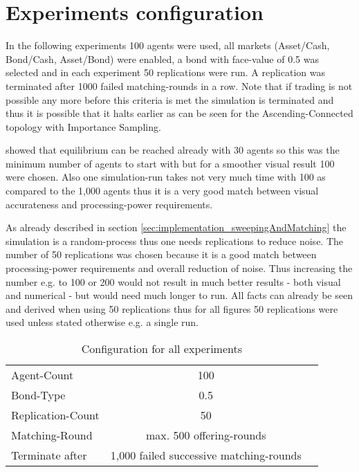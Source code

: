 \documentclass[Bachelorarbeit.tex]{subfiles}
\begin{document}
\section{Experiments configuration}
In the following experiments 100 agents were used, all markets (Asset/Cash, Bond/Cash, Asset/Bond) were enabled, a bond with face-value of 0.5 was selected and in each experiment 50 replications were run. A replication was terminated after 1000 failed matching-rounds in a row. Note that if trading is not possible any more before this criteria is met the simulation is terminated and thus it is possible that it halts earlier as can be seen for the Ascending-Connected topology with Importance Sampling.

\bigskip 

\cite{Breuer2015} showed that equilibrium can be reached already with 30 agents so this was the minimum number of agents to start with but for a smoother visual result 100 were chosen. Also one simulation-run takes not very much time with 100 as compared to the 1,000 agents thus it is a very good match between visual accurateness and processing-power requirements.

\medskip

As already described in section \ref{sec:implementation_sweepingAndMatching} the simulation is a random-process thus one needs replications to reduce noise. The number of 50 replications was chosen because it is a good match between processing-power requirements and overall reduction of noise. Thus increasing the number e.g. to 100 or 200 would not result in much better results - both visual and numerical - but would need much longer to run. All facts can already be seen and derived when using 50 replications thus for all figures 50 replications were used unless stated otherwise e.g. a single run.

\begin{table}[H]
	\centering
	\caption{Configuration for all experiments}
	\begin{tabular} { l c r }
		\hline
		Agent-Count & 100 \\
		Bond-Type & 0.5 \\
		Replication-Count & 50 \\
		Matching-Round & max. 500 offering-rounds \\
		Terminate after & 1,000 failed successive matching-rounds \\
		\hline
	\end{tabular}
\end{table}
\end{document}
